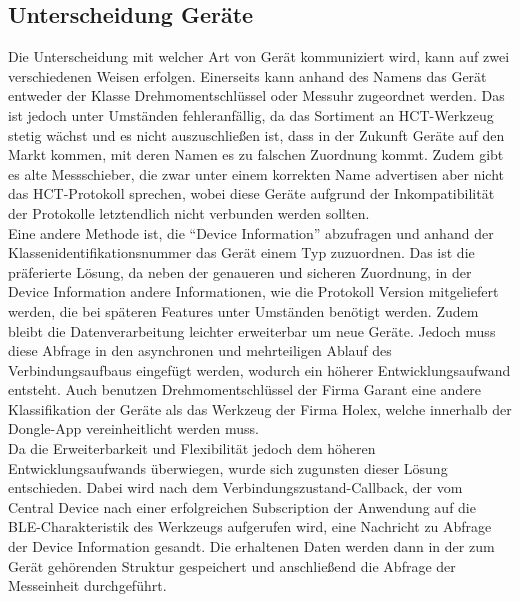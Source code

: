 \subsection{Unterscheidung Geräte}
Die Unterscheidung mit welcher Art von Gerät kommuniziert wird, kann auf zwei verschiedenen Weisen erfolgen. Einerseits kann anhand des Namens das Gerät entweder der Klasse Drehmomentschlüssel oder Messuhr zugeordnet werden. Das ist jedoch unter Umständen fehleranfällig, da das Sortiment an \ac{HCT}-Werkzeug stetig wächst und es nicht auszuschließen ist, dass in der Zukunft Geräte auf den Markt kommen, mit deren Namen es zu falschen Zuordnung kommt. Zudem gibt es alte Messschieber, die zwar unter einem korrekten Name advertisen aber nicht das \ac{HCT}-Protokoll sprechen, wobei diese Geräte aufgrund der Inkompatibilität der Protokolle letztendlich nicht verbunden werden sollten.\\
Eine andere Methode ist, die ``Device Information'' abzufragen und anhand der Klassenidentifikationsnummer das Gerät einem Typ zuzuordnen. Das ist die präferierte Lösung, da neben der genaueren und sicheren Zuordnung, in der Device Information andere Informationen, wie die Protokoll Version mitgeliefert werden, die bei späteren Features unter Umständen benötigt werden. Zudem bleibt die Datenverarbeitung leichter erweiterbar um neue Geräte. Jedoch muss diese Abfrage in den asynchronen und mehrteiligen Ablauf des Verbindungsaufbaus eingefügt werden, wodurch ein höherer Entwicklungsaufwand entsteht. Auch benutzen Drehmomentschlüssel der Firma Garant eine andere Klassifikation der Geräte als das Werkzeug der Firma Holex, welche innerhalb der Dongle-App vereinheitlicht werden muss.\\
Da die Erweiterbarkeit und Flexibilität jedoch dem höheren Entwicklungsaufwands überwiegen, wurde sich zugunsten dieser Lösung entschieden. Dabei wird nach dem Verbindungszustand-Callback, der vom Central Device nach einer erfolgreichen Subscription der Anwendung auf die \ac{BLE}-Charakteristik des Werkzeugs aufgerufen wird, eine Nachricht zu Abfrage der Device Information gesandt. Die erhaltenen Daten werden dann in der zum Gerät gehörenden Struktur gespeichert und anschließend die Abfrage der Messeinheit durchgeführt.

